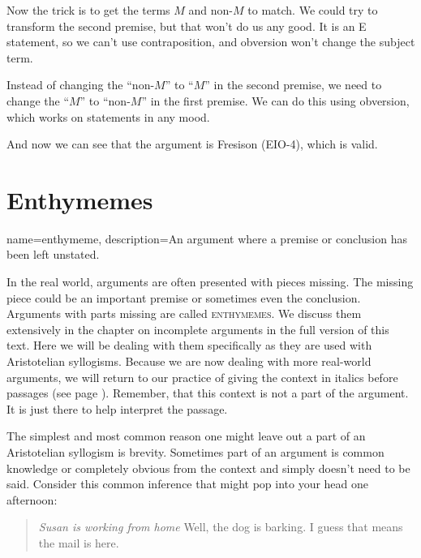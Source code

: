 Now the trick is to get the terms $M$ and non-$M$ to match. We could try to transform the second premise, but that won't do us any good. It is an E statement, so we can't use contraposition, and obversion won't change the subject term.

Instead of changing the ``non-$M$'' to ``$M$'' in the second premise, we need to change the ``$M$'' to ``non-$M$'' in the first premise. We can do this using obversion, which works on statements in any mood.

\begin{kormanize}
\end{kormanize}

And now we can see that the argument is Fresison (EIO-4), which is valid.


\section{Enthymemes}
\label{sec:enthymemes}
{
name=enthymeme,
description={An argument where a premise or conclusion has been left unstated.}
}


In the real world, arguments are often presented with pieces missing. The missing piece could be an important premise or sometimes even the conclusion.  Arguments with parts missing are called \textsc{\glspl{enthymeme}}. \label{def:enthymeme} We discuss them extensively in the chapter on incomplete arguments in the full version of this text. Here we will be dealing with them specifically as they are used with Aristotelian syllogisms. Because we are now dealing with more real-world arguments, we will return to our practice of giving the context in italics before passages (see page \pageref{context_marker}). Remember, that this context is not a part of the argument. It is just there to help interpret the passage.

The simplest and most common reason one might leave out a part of an Aristotelian syllogism is brevity. Sometimes part of an argument is common knowledge or completely obvious from the context and simply doesn't need to be said. Consider this common inference that might pop into your head one afternoon:

\begin{quotation} \noindent \textit{Susan is working from home} Well, the dog is barking. I guess that means the mail is here.\end{quotation}

